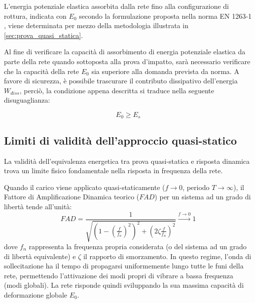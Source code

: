 L'energia potenziale elastica assorbita dalla rete fino alla configurazione di rottura, indicata con $E_0$ secondo la formulazione proposta nella norma EN 1263-1 \cite{EN1263-1}, viene determinata per mezzo della metodologia illustrata in \cref{sec:prova_quasi_statica}. 

Al fine di verificare la capacità di assorbimento di energia potenziale elastica da parte della rete quando sottoposta alla prova d'impatto, sarà necessario verificare che la capacità della rete $E_0$ sia superiore alla domanda prevista da norma. A favore di sicurezza, è possibile trascurare il contributo dissipativo dell'energia $W_{diss}$, perciò, la condizione appena descritta si traduce nella seguente disuguaglianza:

\begin{equation}
  E_0 \ge E_{s}
\end{equation} 

\subsection{Limiti di validità dell'approccio quasi-statico}
La validità dell'equivalenza energetica tra prova quasi-statica e risposta dinamica trova un limite fisico fondamentale nella risposta in frequenza della rete. 

Quando il carico viene applicato quasi-staticamente ($f \to 0$, periodo $T \to \infty$), il Fattore di Amplificazione Dinamica teorico ($FAD$) per un sistema ad un grado di libertà tende all'unità:
\begin{equation}
   FAD = \frac{1}{\sqrt{\left(1 - \left(\frac{f}{f_n}\right)^2\right)^2 + \left(2\zeta \frac{f}{f_n}\right)^2}} \xrightarrow{f \to 0} 1
   \label{eq:FAD}
\end{equation}
dove $f_n$ rappresenta la frequenza propria considerata (o del sistema ad un grado di libertà equivalente) e $\zeta$ il rapporto di smorzamento. In questo regime, l'onda di sollecitazione ha il tempo di propagarsi uniformemente lungo tutte le funi della rete, permettendo l'attivazione dei modi propri di vibrare a bassa frequenza (modi globali). La rete risponde quindi sviluppando la sua massima capacità di deformazione globale $E_0$. 

